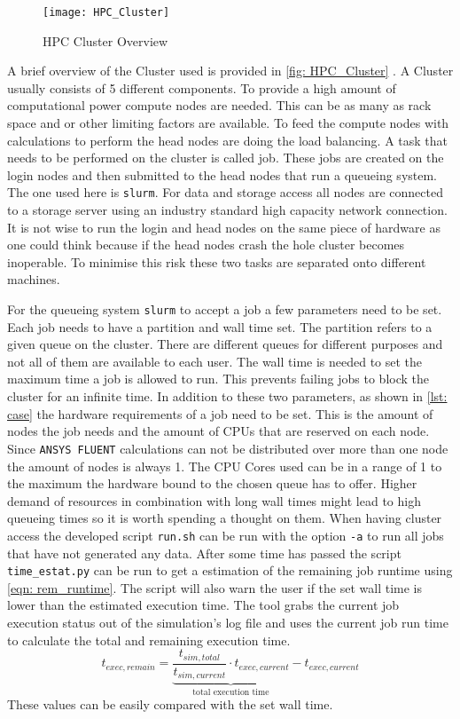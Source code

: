 \documentclass[../thesis.tex]{subfiles}
\begin{document}
\begin{figure}[htbp]
	\centering
	\texttt{[image: HPC\_Cluster]}
	\caption{HPC Cluster Overview}
	\label{fig: HPC_Cluster}
\end{figure}

A brief overview of the Cluster used is provided in \autoref{fig: HPC_Cluster} \cite{schulz2022hardware_and_num}. A Cluster usually consists of 5 different components. To provide a high amount of computational power compute nodes are needed. This can be as many as rack space and or other limiting factors are available. To feed the compute nodes with calculations to perform the head nodes are doing the load balancing. A task that needs to be performed on the cluster is called job. These jobs are created on the login nodes and then submitted to the head nodes that run a queueing system. The one used here is \texttt{slurm}. For data and storage access all nodes are connected to a storage server using an industry standard high capacity network connection. It is not wise to run the login and head nodes on the same piece of hardware as one could think because if the head nodes crash the hole cluster becomes inoperable. To minimise this risk these two tasks are separated onto different machines.

For the queueing system \texttt{slurm} to accept a job a few parameters need to be set. Each job needs to have a partition and wall time set. The partition refers to a given queue on the cluster. There are different queues for different purposes and not all of them are available to each user.
The wall time is needed to set the maximum time a job is allowed to run. This prevents failing jobs to block the cluster for an infinite time. In addition to these two parameters, as shown in \autoref{lst: case} the hardware requirements of a job need to be set. This is the amount of nodes the job needs and the amount of CPUs that are reserved on each node. Since \texttt{ANSYS FLUENT} calculations can not be distributed over more than one node the amount of nodes is always 1. The CPU Cores used can be in a range of 1 to the maximum the hardware bound to the chosen queue has to offer. Higher demand of resources in combination with long wall times might lead to high queueing times so it is worth spending a thought on them. When having cluster access the developed script \texttt{run.sh} can be run with the option \texttt{-a} to run all jobs that have not generated any data. After some time has passed the script \texttt{time\_estat.py} can be run to get a estimation of the remaining job runtime using \autoref{eqn: rem_runtime}. The script will also warn the user if the set wall time is lower than the estimated execution time. The tool grabs the current job execution status out of the simulation's log file and uses the current job run time to calculate the total and remaining execution time. 
\begin{equation}
\label{eqn: rem_runtime}
t_{exec,remain} = \underbrace{\dfrac{t_{sim,total}}{t_{sim,current}} \cdot t_{exec,current}}_{\text{total execution time}}  - t_{exec,current} 
\end{equation}
These values can be easily compared with the set wall time.
\end{document}
